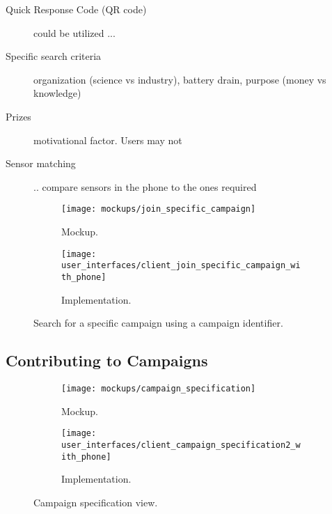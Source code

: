 \begin{description}
 	\item[Quick Response Code (QR code)] could be utilized ...
 	\item[Specific search criteria] organization (science vs industry), battery drain, purpose (money vs knowledge)
 	\item[Prizes] motivational factor. Users may not
 	\item[Sensor matching] .. compare sensors in the phone to the ones required
\end{description} 


\begin{figure}[!htbp]
\begin{subfigure}[!t]{.48\textwidth}
  \centering
  \texttt{[image: mockups/join\_specific\_campaign]}
  \caption{Mockup.}
  \label{fig:mockup_specific_campaign}
\end{subfigure}%
\begin{subfigure}[!t]{.52\textwidth}
  \centering
  \texttt{[image: user\_interfaces/client\_join\_specific\_campaign\_with\_phone]}
  \caption{Implementation.}
  \label{fig:implementation_specific_campaign}
\end{subfigure}
\caption{Search for a specific campaign using a campaign identifier.}
\label{fig:specific_campaign}
\end{figure}
\FloatBarrier

\subsection{Contributing to Campaigns}

\begin{figure}[!htbp]
\begin{subfigure}[!t]{.48\textwidth}
  \centering
  \texttt{[image: mockups/campaign\_specification]}
  \caption{Mockup.}
  \label{fig:mockup_campaign_specification}
\end{subfigure}%
\begin{subfigure}[!t]{.52\textwidth}
  \centering
  \texttt{[image: user\_interfaces/client\_campaign\_specification2\_with\_phone]}
  \caption{Implementation.}
  \label{fig:implementation_campaign_specification}
\end{subfigure}
\caption{Campaign specification view.}
\label{fig:campaign_specification}
\end{figure}
\FloatBarrier

